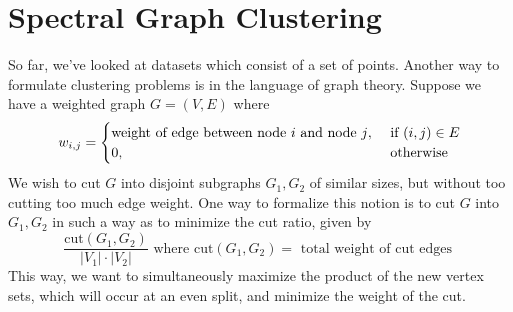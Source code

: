 \documentclass{article}
\begin{document}
\section{Spectral Graph Clustering}
So far, we've looked at datasets which consist of a set of points. Another way to formulate clustering problems is in the language of graph theory. Suppose we have a weighted graph $ G = (V, E) $ where 
$$ w_{i, j} = \begin{cases}
    \text{weight of edge between node $ i $ and node $ j $}, & \text{ if } (i, j) \in E \\
    0, & \text{ otherwise}
\end{cases} $$
We wish to cut $ G $ into disjoint subgraphs $ G_1, G_2 $ of similar sizes, but without too cutting too much edge weight. One way to formalize this notion is to cut $ G $ into $ G_1, G_2 $ in such a way as to minimize the cut ratio, given by
$$ \frac{\text{cut}(G_1, G_2)}{| V_1 | \cdot | V_2 |} \text{ where } \text{cut}(G_1, G_2) = \text{ total weight of cut edges } $$
This way, we want to simultaneously maximize the product of the new vertex sets, which will occur at an even split, and minimize the weight of the cut. 
\end{document}
